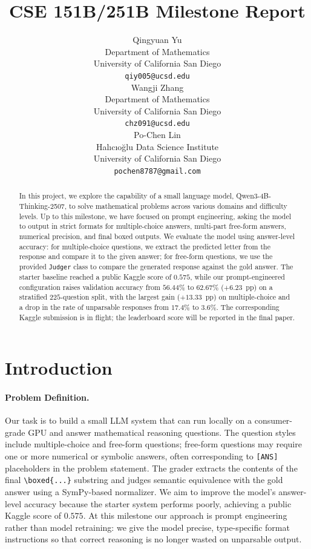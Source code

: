 \documentclass{article}
\title{
CSE 151B/251B Milestone Report
\\
}
\author{%
  Qingyuan Yu
  \\
  Department of Mathematics\\
  University of California San Diego\\
  \texttt{qiy005@ucsd.edu} \\
  \AND
  Wangji Zhang \\
  Department of Mathematics \\
  University of California San Diego \\
  \texttt{chz091@ucsd.edu} \\
  \And
  Po-Chen Lin \\
  Halıcıoğlu Data Science Institute \\
  University of California San Diego \\
  \texttt{pochen8787@gmail.com} \\
}
\begin{document}
\maketitle


\begin{abstract}
In this project, we explore the capability of a small language model,
Qwen3-4B-Thinking-2507, to solve mathematical problems across various
domains and difficulty levels. Up to this milestone, we have focused on
prompt engineering, asking the model to output in strict formats for
multiple-choice answers, multi-part free-form answers, numerical
precision, and final boxed outputs. We evaluate the model using
answer-level accuracy: for multiple-choice questions, we extract the
predicted letter from the response and compare it to the given answer;
for free-form questions, we use the provided \texttt{Judger} class to
compare the generated response against the gold answer. The starter
baseline reached a public Kaggle score of $0.575$, while our
prompt-engineered configuration raises validation accuracy from
$56.44\%$ to $62.67\%$ ($+6.23$~pp) on a stratified $225$-question
split, with the largest gain ($+13.33$~pp) on multiple-choice and a
drop in the rate of unparsable responses from $17.4\%$ to $3.6\%$. The
corresponding Kaggle submission is in flight; the leaderboard score
will be reported in the final paper.
\end{abstract}


\section{Introduction}
\label{sec:intro}

\paragraph{Problem Definition.}
Our task is to build a small LLM system that can run locally on a
consumer-grade GPU and answer mathematical reasoning questions. The
question styles include multiple-choice and free-form questions;
free-form questions may require one or more numerical or symbolic
answers, often corresponding to \texttt{[ANS]} placeholders in the
problem statement. The grader extracts the contents of the final
\verb|\boxed{...}| substring and judges semantic equivalence with the
gold answer using a SymPy-based normalizer. We aim to improve the
model's answer-level accuracy because the starter system performs
poorly, achieving a public Kaggle score of $0.575$. At this milestone
our approach is prompt engineering rather than model retraining: we
give the model precise, type-specific format instructions so that
correct reasoning is no longer wasted on unparsable output.
\end{document}
